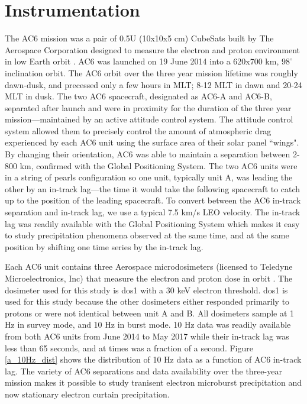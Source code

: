 \documentclass[draft]{agujournal2019}
\begin{document}
\section{Instrumentation} \label{instrumentation}
The AC6 mission was a pair of 0.5U (10x10x5 cm) CubeSats built by The Aerospace Corporation designed to measure the electron and proton environment in low Earth orbit \cite{O'brien2016}. AC6 was launched on 19 June 2014 into a 620x700 km, $98^\circ$ inclination orbit. The AC6 orbit over the three year mission lifetime was roughly dawn-dusk, and precessed only a few hours in MLT; 8-12 MLT in dawn and 20-24 MLT in dusk. The two AC6 spacecraft, designated as AC6-A and AC6-B, separated after launch and were in proximity for the duration of the three year mission---maintained by an active attitude control system. The attitude control system allowed them to precisely control the amount of atmospheric drag experienced by each AC6 unit using the surface area of their solar panel ``wings". By changing their orientation, AC6 was able to maintain a separation between 2-800 km, confirmed with the Global Positioning System. The two AC6 units were in a string of pearls configuration so one unit, typically unit A, was leading the other by an in-track lag---the time it would take the following spacecraft to catch up to the position of the leading spacecraft. To convert between the AC6 in-track separation and in-track lag, we use a typical 7.5 km/s LEO velocity. The in-track lag was readily available with the Global Positioning System which makes it easy to study precipitation phenomena observed at the same time, and at the same position by shifting one time series by the in-track lag.

Each AC6 unit contains three Aerospace microdosimeters (licensed to Teledyne Microelectronics, Inc) that measure the electron and proton dose in orbit \cite{O'brien2016}. The dosimeter used for this study is dos1 with a $30$ keV electron threshold. dos1 is used for this study because the other dosimeters either responded primarily to protons or were not identical between unit A and B. All dosimeters sample at 1 Hz in survey mode, and 10 Hz in burst mode. 10 Hz data was readily available from both AC6 units from June 2014 to May 2017 while their in-track lag was less than 65 seconds, and at times was a fraction of a second. Figure \ref{a_10Hz_dist} shows the distribution of 10 Hz data as a function of AC6 in-track lag. The variety of AC6 separations and data availability over the three-year mission makes it possible to study tranisent electron microburst precipitation \cite{Shumko2020} and now stationary electron curtain precipitation.
\end{document}
